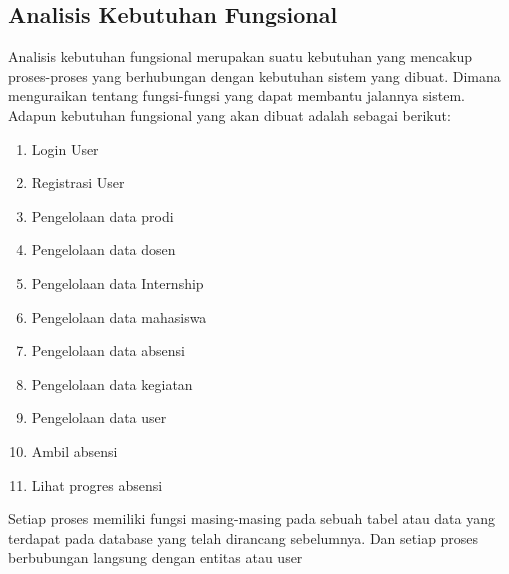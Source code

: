 \subsection{Analisis Kebutuhan Fungsional}
Analisis kebutuhan fungsional merupakan suatu kebutuhan yang mencakup proses-proses yang berhubungan dengan kebutuhan sistem yang dibuat. Dimana menguraikan tentang fungsi-fungsi yang dapat membantu jalannya sistem. Adapun kebutuhan fungsional yang akan dibuat adalah sebagai berikut:
\begin{enumerate}
	\item Login User
	\item Registrasi User
	\item Pengelolaan data prodi
	\item Pengelolaan data dosen
	\item Pengelolaan data Internship
	\item Pengelolaan data mahasiswa
	\item Pengelolaan data absensi
	\item Pengelolaan data kegiatan
	\item Pengelolaan data user
	\item Ambil absensi
	\item Lihat progres absensi
\end{enumerate}
Setiap proses memiliki fungsi masing-masing pada sebuah tabel atau data yang terdapat pada database yang telah dirancang sebelumnya. Dan setiap proses berbubungan langsung dengan entitas atau user
